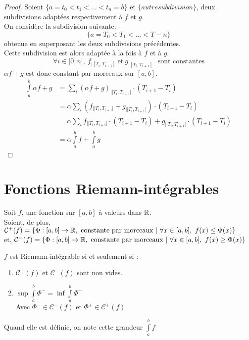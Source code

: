 \documentclass[../main.tex]{subfile}
\begin{document}
\begin{proof}
	Soient $\{a = t_0 < t_1 < ... < t_n = b\}$ et $\{autre subdivision\}$, 
	deux subdivisions adaptées respectivement à $f$ et $g$.\\
	On considère la subdivision suivante:
	$$\{a = T_0 < T_1 < ... < T-n\}$$
	obtenue en superposant les deux subdivisions précédentes.\\
	Cette subdivision est alors adaptée à la fois à $f$ et à $g$.\\
	$$\forall i \in [0, n[, \ f_{|[T_i, T_{i+1}]} \ \text{et} \ g_{|[T_i, T_{i+1}]} \ \ \ \text{sont constantes}$$
	$\alpha f + g$ est donc constant par morceaux sur $[a, b]$.\\
	$$
	\begin{aligned}
		\int\limits_a^b \alpha f + g &= \sum\limits_i (\alpha f + g)_{|[T_i, T_{i+1}[} \cdot (T_{i+1} - T_i)\\
		&=\alpha \sum\limits_i (f_{|[T_i, T_{i+1}[} + g_{|[T_i, T_{i+1}[}) \cdot (T_{i+1} - T_i)\\
		&=\alpha \sum\limits_i f_{|[T_i, T_{i+1}[} \cdot (T_{i+1} - T_i) + g_{|[T_i, T_{i+1}[} \cdot (T_{i+1} - T_i)\\
		&=\alpha \int\limits_a^b f + \int\limits_a^b g
	\end{aligned}
	$$
\end{proof}

\section{Fonctions Riemann-intégrables}

\begin{nota}
	Soit $f$, une fonction sur $[a, b]$ à valeurs dans $\mathbb{R}$.\\
	Soient, de plus, $\mathcal{C}^+(f)=\{\Phi : [a, b] \to \mathbb{R}, \ \text{constante par morceaux} \ | \ \forall x \in [a, b], \ f(x) \leq \Phi(x)\}$\\
	et, $\mathcal{C}^-(f)=\{\Phi : [a, b] \to \mathbb{R}, \ \text{constante par morceaux} \ | \ \forall x \in [a, b], \ f(x) \geq \Phi(x)\}$
\end{nota}

\begin{defi}
	$f$ est Riemann-intégrable si et seulement si :
	\begin{enumerate}
		\item $\mathcal{C}^+(f)$ et $\mathcal{C}^-(f)$ sont non vides.
		\item $\sup \int\limits_a^b \Phi^- = \inf \int\limits_a^b \Phi^+$\\
		Avec $\Phi^- \in \mathcal{C}^-(f)$ et $\Phi^+ \in \mathcal{C}^+(f)$
	\end{enumerate}

	Quand elle est définie, on note cette grandeur $\int\limits_a^b f$
\end{defi}
\end{document}
